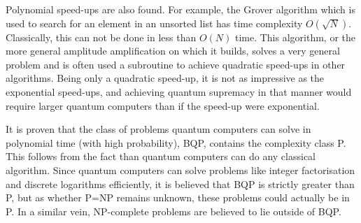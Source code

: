 Polynomial speed-ups are also found.
For example, the Grover algorithm which is used to search for an element in an unsorted list has time complexity $O(\sqrt{N})$.
Classically, this can not be done in less than $O(N)$ time.
This algorithm, or the more general amplitude amplification on which it builds, solves a very general problem and is often used a subroutine to achieve quadratic speed-ups in other algorithms.
Being only a quadratic speed-up, it is not as impressive as the exponential speed-ups,
and achieving quantum supremacy in that manner would require larger quantum computers than if the speed-up were exponential.

It is proven that the class of problems quantum computers can solve in polynomial time (with high probability), BQP, contains the complexity class P.
This follows from the fact than quantum computers can do any classical algorithm.
Since quantum computers can solve problems like integer factorisation and discrete logarithms efficiently, it is believed that BQP is strictly greater than P, but as whether P=NP remains unknown, these problems could actually be in P.
In a similar vein, NP-complete problems are believed to lie outside of BQP.